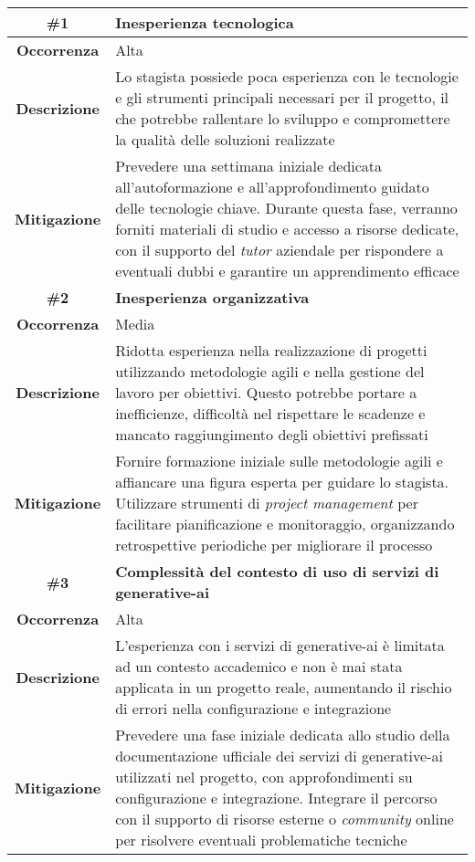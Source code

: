 \begin{longtable}{|c|>{\centering\arraybackslash}p{}|} %
    \hline
    \rowcolor{green!30} 
    \textbf{\#1} & \textbf{Inesperienza tecnologica} \\
    \hline
    \textbf{Occorrenza} & Alta \\
    \hline
    \textbf{Descrizione} & Lo stagista possiede poca esperienza con le tecnologie e gli strumenti principali necessari per il progetto, il che potrebbe rallentare lo sviluppo e compromettere la qualità delle soluzioni realizzate\\
    \hline
    \textbf{Mitigazione} & Prevedere una settimana iniziale dedicata all’autoformazione e all’approfondimento guidato delle tecnologie chiave. Durante questa fase, verranno forniti materiali di studio e accesso a risorse dedicate, con il supporto del \textit{tutor} aziendale per rispondere a eventuali dubbi e garantire un apprendimento efficace\\
    \hline

    \rowcolor{green!30} %
    \textbf{\#2} & \textbf{Inesperienza organizzativa} \\
    \hline
    \textbf{Occorrenza} & Media \\
    \hline
    \textbf{Descrizione} & Ridotta esperienza nella realizzazione di progetti utilizzando metodologie agili e nella gestione del lavoro per obiettivi. Questo potrebbe portare a inefficienze, difficoltà nel rispettare le scadenze e mancato raggiungimento degli obiettivi prefissati\\
    \hline
    \textbf{Mitigazione} & Fornire formazione iniziale sulle metodologie agili e affiancare una figura esperta per guidare lo stagista. Utilizzare strumenti di \textit{project management} per facilitare pianificazione e monitoraggio, organizzando retrospettive periodiche per migliorare il processo\\
    \hline
    \pagebreak

    \hline
    \rowcolor{green!30} %
    \textbf{\#3} & \textbf{Complessità del contesto di uso di servizi di \gls{generative-ai}} \\
    \hline
    \textbf{Occorrenza} & Alta \\
    \hline
    \textbf{Descrizione} & L’esperienza con i servizi di \gls{generative-ai} è limitata ad un contesto accademico e non è mai stata applicata in un progetto reale, aumentando il rischio di errori nella configurazione e integrazione\\
    \hline
    \textbf{Mitigazione} & Prevedere una fase iniziale dedicata allo studio della documentazione ufficiale dei servizi di \gls{generative-ai} utilizzati nel progetto, con approfondimenti su configurazione e integrazione. Integrare il percorso con il supporto di risorse esterne o \textit{community} online per risolvere eventuali problematiche tecniche\\
    \hline


\end{longtable}
